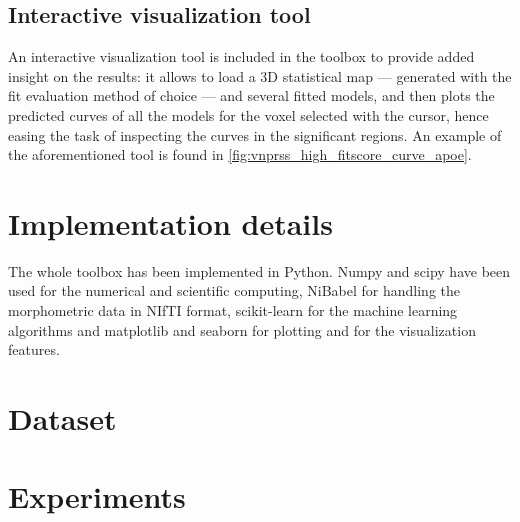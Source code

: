 \documentclass{article}
\begin{document}
\subsection{Interactive visualization tool}

An interactive visualization tool is included in the toolbox to provide added insight on the results: it allows to load a 3D statistical map — generated with the fit evaluation method of choice — and several fitted models, and then plots the predicted curves of all the models for the voxel selected with the cursor, hence easing the task of inspecting the curves in the significant regions. An example of the aforementioned tool is found in \autoref{fig:vnprss_high_fitscore_curve_apoe}. 

\section{Implementation details}

The whole toolbox has been implemented in Python. Numpy and scipy have been used for the numerical and scientific computing, NiBabel for handling the morphometric data in NIfTI format, scikit-learn for the machine learning algorithms and matplotlib and seaborn for plotting and for the visualization features.

\section{Dataset}

\section{Experiments}
\end{document}

